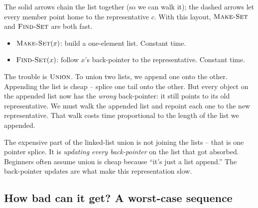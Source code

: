 \begin{center}
\end{center}

The solid arrows chain the list together (so we can walk it); the dashed arrows
let every member point home to the representative $c$. With this layout,
$\textsc{Make-Set}$ and $\textsc{Find-Set}$ are both fast.

\begin{itemize}
  \item $\textsc{Make-Set}(x)$: build a one-element list. Constant time.
  \item $\textsc{Find-Set}(x)$: follow $x$'s back-pointer to the
        representative. Constant time.
\end{itemize}

The trouble is $\textsc{Union}$. To union two lists, we append one onto the
other. Appending the list is cheap -- splice one tail onto the other. But every
object on the appended list now has the \emph{wrong} back-pointer: it still
points to its old representative. We must walk the appended list and repoint
each one to the new representative. That walk costs time proportional to the
length of the list we appended.

\begin{trapbox}
The expensive part of the linked-list union is not joining the lists -- that is
one pointer splice. It is \emph{updating every back-pointer} on the list that
got absorbed. Beginners often assume union is cheap because ``it's just a list
append.'' The back-pointer updates are what make this representation slow.
\end{trapbox}

\subsection{How bad can it get? A worst-case sequence}
\label{ch19:linkedlist-worst}

